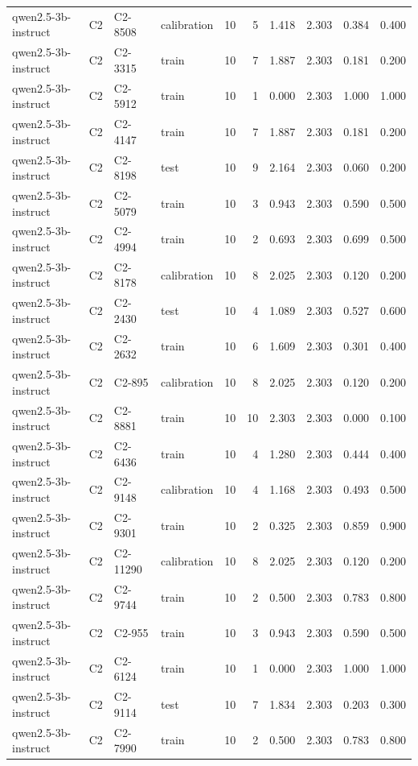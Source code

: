 \begin{table}
\begin{tabular}{llllrrrrrr}
qwen2.5-3b-instruct & C2 & C2-8508 & calibration & 10 & 5 & 1.418 & 2.303 & 0.384 & 0.400 \\
qwen2.5-3b-instruct & C2 & C2-3315 & train & 10 & 7 & 1.887 & 2.303 & 0.181 & 0.200 \\
qwen2.5-3b-instruct & C2 & C2-5912 & train & 10 & 1 & 0.000 & 2.303 & 1.000 & 1.000 \\
qwen2.5-3b-instruct & C2 & C2-4147 & train & 10 & 7 & 1.887 & 2.303 & 0.181 & 0.200 \\
qwen2.5-3b-instruct & C2 & C2-8198 & test & 10 & 9 & 2.164 & 2.303 & 0.060 & 0.200 \\
qwen2.5-3b-instruct & C2 & C2-5079 & train & 10 & 3 & 0.943 & 2.303 & 0.590 & 0.500 \\
qwen2.5-3b-instruct & C2 & C2-4994 & train & 10 & 2 & 0.693 & 2.303 & 0.699 & 0.500 \\
qwen2.5-3b-instruct & C2 & C2-8178 & calibration & 10 & 8 & 2.025 & 2.303 & 0.120 & 0.200 \\
qwen2.5-3b-instruct & C2 & C2-2430 & test & 10 & 4 & 1.089 & 2.303 & 0.527 & 0.600 \\
qwen2.5-3b-instruct & C2 & C2-2632 & train & 10 & 6 & 1.609 & 2.303 & 0.301 & 0.400 \\
qwen2.5-3b-instruct & C2 & C2-895 & calibration & 10 & 8 & 2.025 & 2.303 & 0.120 & 0.200 \\
qwen2.5-3b-instruct & C2 & C2-8881 & train & 10 & 10 & 2.303 & 2.303 & 0.000 & 0.100 \\
qwen2.5-3b-instruct & C2 & C2-6436 & train & 10 & 4 & 1.280 & 2.303 & 0.444 & 0.400 \\
qwen2.5-3b-instruct & C2 & C2-9148 & calibration & 10 & 4 & 1.168 & 2.303 & 0.493 & 0.500 \\
qwen2.5-3b-instruct & C2 & C2-9301 & train & 10 & 2 & 0.325 & 2.303 & 0.859 & 0.900 \\
qwen2.5-3b-instruct & C2 & C2-11290 & calibration & 10 & 8 & 2.025 & 2.303 & 0.120 & 0.200 \\
qwen2.5-3b-instruct & C2 & C2-9744 & train & 10 & 2 & 0.500 & 2.303 & 0.783 & 0.800 \\
qwen2.5-3b-instruct & C2 & C2-955 & train & 10 & 3 & 0.943 & 2.303 & 0.590 & 0.500 \\
qwen2.5-3b-instruct & C2 & C2-6124 & train & 10 & 1 & 0.000 & 2.303 & 1.000 & 1.000 \\
qwen2.5-3b-instruct & C2 & C2-9114 & test & 10 & 7 & 1.834 & 2.303 & 0.203 & 0.300 \\
qwen2.5-3b-instruct & C2 & C2-7990 & train & 10 & 2 & 0.500 & 2.303 & 0.783 & 0.800 \\

\end{tabular}
\end{table}
